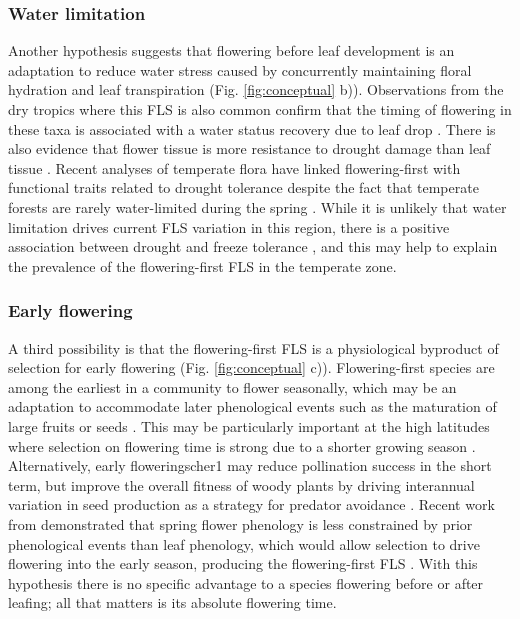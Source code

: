 \documentclass[11pt]{article}
\begin{document}
\subsubsection*{Water limitation}
\noindent Another hypothesis suggests that flowering before leaf development is an adaptation to reduce water stress caused by concurrently maintaining floral hydration and leaf transpiration \citep{Franklin2016} (Fig. \ref{fig:conceptual} b)). Observations from the dry tropics where this FLS is also common confirm that the timing of flowering in these taxa is associated with a water status recovery due to leaf drop \citep{Borchert1983,Reich1984}. There is also evidence that flower tissue is more resistance to drought damage than leaf tissue \citep{Zhang2017}. Recent analyses of temperate flora have linked flowering-first with functional traits related to drought tolerance despite the fact that temperate forests are rarely water-limited during the spring \citep{Gougherty2018}. While it is unlikely that  water limitation drives current FLS variation in this region, there is a positive association between drought and freeze tolerance \citep{Zanne2013}, and this may help to explain the prevalence of the flowering-first FLS in the temperate zone. %
 
\subsubsection*{Early flowering}
\noindent A third possibility is that the flowering-first FLS is a physiological byproduct of selection for early flowering  (Fig. \ref{fig:conceptual} c)). Flowering-first species are among the earliest in a community to flower seasonally, which may be an adaptation to accommodate later phenological events such as the  maturation of large fruits or seeds \citep{Li2016,Primack1987,Ettinger2018}. This may be particularly important at the high latitudes where selection on flowering time is strong due  to a shorter growing season \citep{MunguiaRosas2011}. Alternatively, early flowering{scher1} may reduce pollination success in the short term, but improve the overall fitness of woody plants by driving interannual variation in seed production as a strategy for predator avoidance . Recent work from \citet{Savage2019} demonstrated that spring flower phenology is less constrained by prior phenological events than leaf phenology, which would allow selection to drive flowering into the early season, producing the flowering-first FLS . With this hypothesis there is no specific advantage to a species flowering before or after leafing; all that matters is its absolute flowering time.
\end{document}
